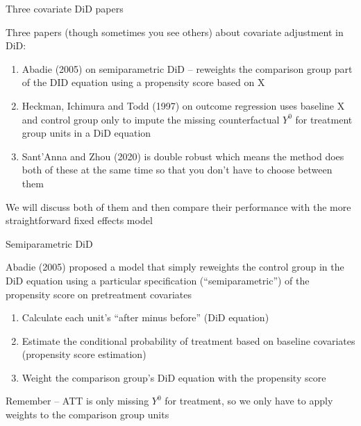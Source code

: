 \documentclass{beamer}
\begin{document}
\begin{frame}{Three covariate DiD papers}

Three papers (though sometimes you see others) about covariate adjustment in DiD:
\begin{enumerate}
\item Abadie (2005) on semiparametric DiD -- reweights the comparison group part of the DID equation using a propensity score based on X
\item Heckman, Ichimura and Todd (1997) on outcome regression uses baseline X and control group only to impute the missing counterfactual $Y^0$ for treatment group units in a DiD equation
\item Sant'Anna and Zhou (2020) is double robust which means the method does both of these at the same time so that you don't have to choose between them
\end{enumerate}

\bigskip

We will discuss both of them and then compare their performance with the more straightforward fixed effects model

\end{frame}



\begin{frame}{Semiparametric DiD}


 Abadie (2005) proposed a model that simply reweights the control group in the DiD equation using a particular specification (``semiparametric'') of the propensity score on pretreatment covariates
 
	\begin{enumerate}
	\item Calculate each unit's ``after minus before'' (DiD equation)
	\item Estimate the conditional probability of treatment based on baseline covariates (propensity score estimation)
	\item Weight the comparison group's DiD equation with the propensity score 
	\end{enumerate}

Remember -- ATT is only missing $Y^0$ for treatment, so we only have to apply weights to the comparison group units

\end{frame}
\end{document}
